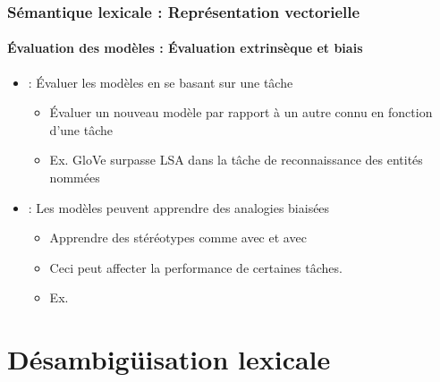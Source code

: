\documentclass[xcolor=table]{beamer}
\begin{document}
\begin{frame}
\frametitle{Sémantique lexicale : Représentation vectorielle}
\framesubtitle{Évaluation des modèles : Évaluation extrinsèque et biais}
	
\begin{itemize}
	\item  {} : Évaluer les modèles en se basant sur une tâche 
	\begin{itemize}
		\item Évaluer un nouveau modèle par rapport à un autre connu en fonction d'une tâche
		\item Ex. GloVe surpasse LSA dans la tâche de reconnaissance des entités nommées \cite{2014-pennington-al}
	\end{itemize}
	\item {} : Les modèles peuvent apprendre des analogies biaisées
	\begin{itemize}
		\item Apprendre des stéréotypes comme  avec  et  avec  \cite{2017-caliskan-al}
		\item Ceci peut affecter la performance de certaines tâches. 
		\item Ex. 
	\end{itemize}
\end{itemize}
	
\end{frame}


\section{Désambigüisation lexicale}
\end{document}
